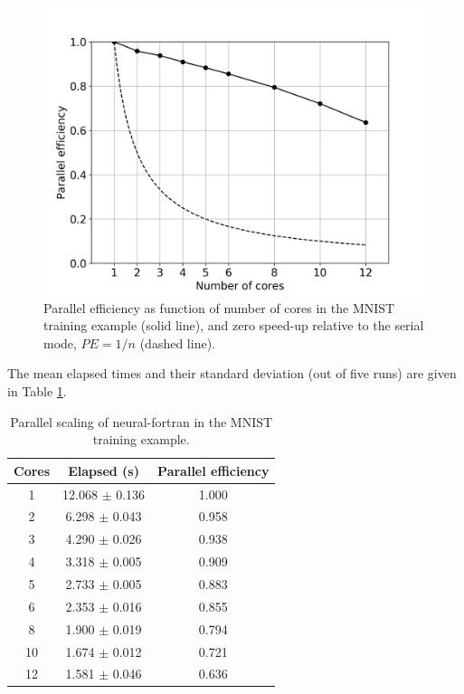 \documentclass[sigplan, review=false, screen=true, balance=true]{acmart}
\begin{document}
\begin{figure}[H]
  \centering
  \includegraphics[width=\columnwidth]{../figures/nf-parallel-efficiency.png}
	\caption{Parallel efficiency as function of number of cores in the MNIST training example (solid line),
	   and zero speed-up relative to the serial mode, $PE = 1/n$ (dashed line).}
  \label{fig_mnist_efficiency}
\end{figure}

The mean elapsed times and their standard deviation (out of five runs) are
given in Table \ref{table_parallel}.

\begin{center}
\begin{table}[h]
\caption{Parallel scaling of neural-fortran in the MNIST training example.}
\label{table_parallel}
\begin{tabular}{c|c|c}
  \hline
  Cores & Elapsed (s) & Parallel efficiency \\
  \hline
  1 & 12.068 $\pm$ 0.136 & 1.000 \\
  2 & 6.298 $\pm$ 0.043 & 0.958 \\
  3 & 4.290 $\pm$ 0.026 & 0.938 \\
  4 & 3.318 $\pm$ 0.005 & 0.909 \\
  5 & 2.733 $\pm$ 0.005 & 0.883 \\
  6 & 2.353 $\pm$ 0.016 & 0.855 \\
  8 & 1.900 $\pm$ 0.019 & 0.794 \\
  10 & 1.674 $\pm$ 0.012 & 0.721 \\
  12 & 1.581 $\pm$ 0.046 & 0.636 \\
  \hline
\end{tabular}
\end{table}
\end{center}
\end{document}
